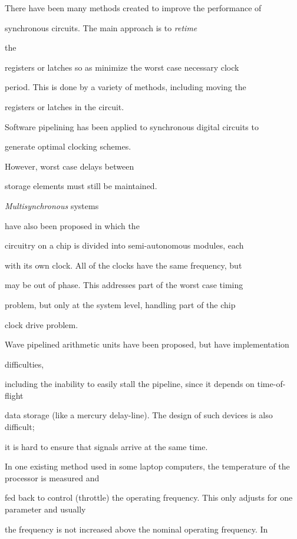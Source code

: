 \documentclass[12pt,dvips]{article}
\begin{document}
There have been many methods created to improve the performance of

synchronous circuits. The main approach is to {\it retime}\cite{Leiserson91}

the

registers or latches so as minimize the worst case necessary clock

period. This is done by a variety of methods, including moving the

registers or latches in the circuit.

Software pipelining has been applied to synchronous digital circuits to

generate optimal clocking schemes\cite{Boyer98}.

However, worst case delays between

storage elements must still be maintained.



{\it Multisynchronous} systems\cite{Ginosar98}

have also been proposed in which the

circuitry on a chip is divided into semi-autonomous modules, each

with its own clock. All of the clocks have the same frequency, but

may be out of phase. This addresses part of the worst case timing

problem, but only at the system level, handling part of the chip

clock drive problem.



Wave pipelined arithmetic units have been proposed, but have implementation

difficulties\cite{Flynn99,Oberman97},

including the inability to easily stall the pipeline, since it depends on time-of-flight

data storage (like a mercury delay-line). The design of such devices is also difficult;

it is hard to ensure that signals arrive at the same time.



In one existing method used in some laptop computers, the temperature of the processor is measured and

fed back to control (throttle) the operating frequency. This only adjusts for one parameter and usually

the frequency is not increased above the nominal operating frequency. In \cite{Merchant96}
\end{document}
